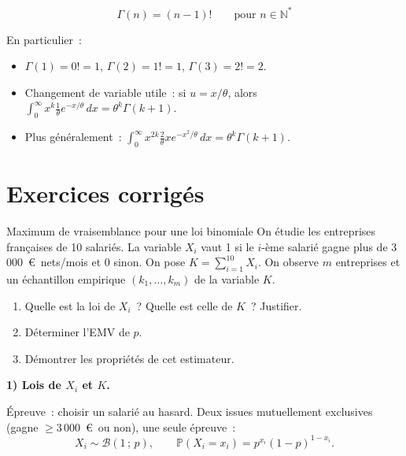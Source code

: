 \documentclass[11pt,a4paper]{article}
\newcommand{\B}{\mathcal{B}}
\newcommand{\Prob}{\mathbb{P}}
\renewcommand{\P}{\Prob}
\newcommand{\corrsep}{\vspace{4pt}{\color{rulecol}\hrule height 0.6pt}\vspace{6pt}}
\begin{document}
\begin{defbox}
$$\Gamma(n) = (n-1)! \qquad \text{pour }n\in\mathbb{N}^*$$

En particulier~:
\begin{itemize}
  \item $\Gamma(1) = 0! = 1$, \quad $\Gamma(2) = 1! = 1$, \quad $\Gamma(3) = 2! = 2$.
  \item Changement de variable utile~: si $u = x/\theta$, alors
    $\displaystyle\int_0^\infty x^k \frac{1}{\theta}e^{-x/\theta}\,dx = \theta^k\Gamma(k+1)$.
  \item Plus g\'en\'eralement~: $\displaystyle\int_0^\infty x^{2k}\frac{2}{\theta}xe^{-x^2/\theta}\,dx = \theta^k\Gamma(k+1)$.
\end{itemize}
\end{defbox}

\newpage
\section{Exercices corrig\'es}

\begin{exercice}{Maximum de vraisemblance pour une loi binomiale}
On \'etudie les entreprises fran\c{c}aises de 10 salari\'es. La variable $X_i$ vaut 1 si le $i$-\`eme
salari\'e gagne plus de 3\,000~\euro\ nets/mois et 0 sinon. On pose $K=\sum_{i=1}^{10}X_i$.
On observe $m$ entreprises et un \'echantillon empirique $(k_1,\ldots,k_m)$ de la variable $K$.

\begin{enumerate}[label=\textbf{\arabic*)}]
  \item Quelle est la loi de $X_i$~? Quelle est celle de $K$~? Justifier.
  \item D\'eterminer l'EMV de $p$.
  \item D\'emontrer les propri\'et\'es de cet estimateur.
\end{enumerate}
\end{exercice}

\corrsep

\textbf{1) Lois de $X_i$ et $K$.}

\'Epreuve~: choisir un salari\'e au hasard. Deux issues mutuellement exclusives (gagne $\geq 3\,000$~\euro\ ou non), une seule \'epreuve~:
$$X_i \sim \B(1\,;\,p), \qquad \P(X_i=x_i)=p^{x_i}(1-p)^{1-x_i}.$$
\end{document}
